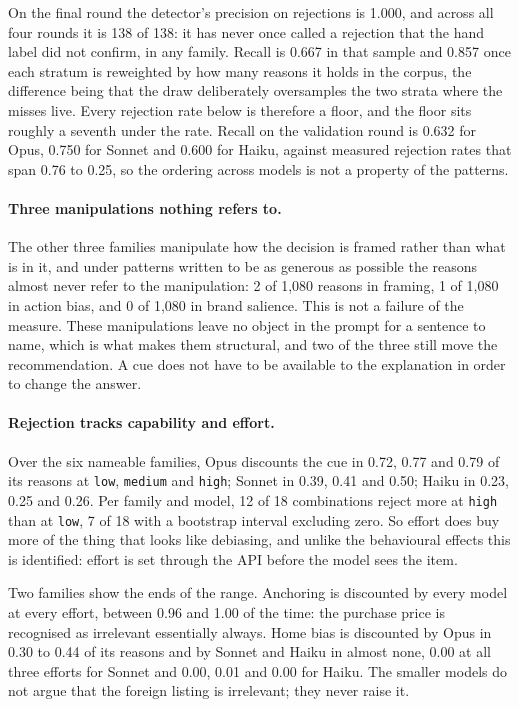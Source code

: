 On the final round the detector's precision on rejections is 1.000, and
across all four rounds it is 138 of 138: it has never once called a rejection
that the hand label did not confirm, in any family. Recall is 0.667 in that
sample and 0.857 once each stratum is reweighted by how many reasons it holds
in the corpus, the difference being that the draw deliberately oversamples
the two strata where the misses live. Every rejection rate below is therefore
a floor, and the floor sits roughly a seventh under the rate. Recall on the
validation round is 0.632 for Opus, 0.750 for Sonnet and 0.600 for Haiku,
against measured rejection rates that span 0.76 to 0.25, so the ordering
across models is not a property of the patterns.

\paragraph{Three manipulations nothing refers to.} The other three families
manipulate how the decision is framed rather than what is in it, and under
patterns written to be as generous as possible the reasons almost never refer
to the manipulation: 2 of 1{,}080 reasons in framing, 1 of 1{,}080 in
action bias, and 0 of 1{,}080 in brand salience. This is not a failure of the
measure. These manipulations leave no object in the prompt for a sentence to
name, which is what makes them structural, and two of the three still move
the recommendation. A cue does not have to be available to the explanation
in order to change the answer.

\paragraph{Rejection tracks capability and effort.} Over the six nameable
families, Opus discounts the cue in 0.72, 0.77 and 0.79 of its reasons at
\texttt{low}, \texttt{medium} and \texttt{high}; Sonnet in 0.39, 0.41 and
0.50; Haiku in 0.23, 0.25 and 0.26. Per family and model, 12 of 18
combinations reject more at \texttt{high} than at \texttt{low}, 7 of 18 with
a bootstrap interval excluding zero. So effort does buy more of the thing
that looks like debiasing, and unlike the behavioural effects this is
identified: effort is set through the API before the model sees the item.

Two families show the ends of the range. Anchoring is discounted by every
model at every effort, between 0.96 and 1.00 of the time: the purchase price
is recognised as irrelevant essentially always. Home bias is discounted by
Opus in 0.30 to 0.44 of its reasons and by Sonnet and Haiku in almost none,
0.00 at all three efforts for Sonnet and 0.00, 0.01 and 0.00 for Haiku. The
smaller models do not argue that the foreign listing is irrelevant; they
never raise it.

